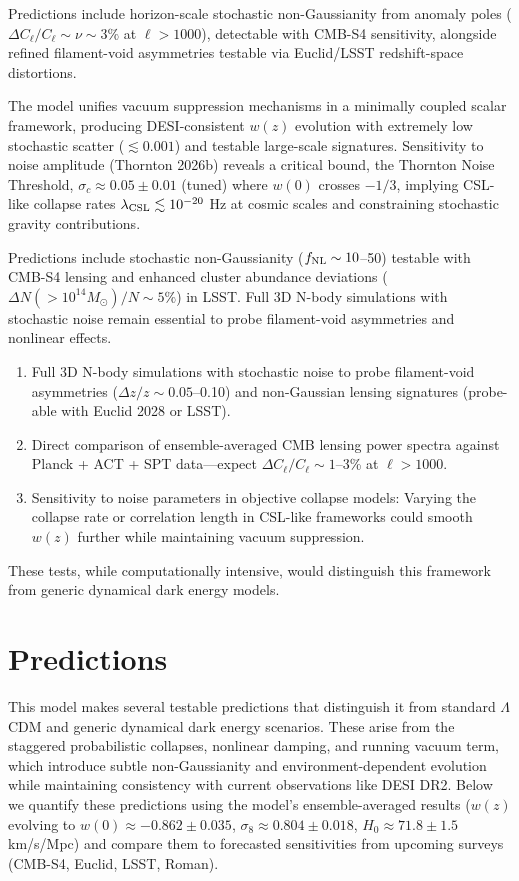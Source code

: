 \documentclass[preprint]{aastex7}
\begin{document}
Predictions include horizon-scale stochastic non-Gaussianity from anomaly poles (\( \Delta C_\ell / C_\ell \sim \nu \sim 3\% \) at \( \ell > 1000 \)), detectable with CMB-S4 sensitivity, alongside refined filament-void asymmetries testable via Euclid/LSST redshift-space distortions.

The model unifies vacuum suppression mechanisms in a minimally coupled scalar framework, producing DESI-consistent \( w(z) \) evolution with extremely low stochastic scatter (\( \lesssim 0.001 \)) and testable large-scale signatures. Sensitivity to noise amplitude (Thornton 2026b) reveals a critical bound, the Thornton Noise Threshold, \( \sigma_c \approx 0.05 \pm 0.01 \) (tuned) where \( w(0) \) crosses \( -1/3 \), implying CSL-like collapse rates \( \lambda_{\rm CSL} \lesssim 10^{-20} \) Hz at cosmic scales and constraining stochastic gravity contributions.

Predictions include stochastic non-Gaussianity (\( f_{\rm NL} \sim 10 \)--50) testable with CMB-S4 lensing and enhanced cluster abundance deviations (\( \Delta N(>10^{14} M_\odot)/N \sim 5\% \)) in LSST. Full 3D N-body simulations with stochastic noise remain essential to probe filament-void asymmetries and nonlinear effects.


\begin{enumerate}
\item Full 3D N-body simulations with stochastic noise to probe filament-void asymmetries (\( \Delta z/z \sim 0.05 \)--0.10) and non-Gaussian lensing signatures (probe-able with Euclid 2028 or LSST).
\item Direct comparison of ensemble-averaged CMB lensing power spectra against Planck + ACT + SPT data—expect \( \Delta C_\ell / C_\ell \sim 1 \)--3\% at \( \ell > 1000 \).
\item Sensitivity to noise parameters in objective collapse models: Varying the collapse rate or correlation length in CSL-like frameworks could smooth \( w(z) \) further while maintaining vacuum suppression.
\end{enumerate}

These tests, while computationally intensive, would distinguish this framework from generic dynamical dark energy models.

\section{Predictions} \label{sec:predictions}

This model makes several testable predictions that distinguish it from standard $\Lambda$CDM and generic dynamical dark energy scenarios. These arise from the staggered probabilistic collapses, nonlinear damping, and running vacuum term, which introduce subtle non-Gaussianity and environment-dependent evolution while maintaining consistency with current observations like DESI DR2. Below we quantify these predictions using the model's ensemble-averaged results (\( w(z) \) evolving to \( w(0) \approx -0.862 \pm 0.035 \), \( \sigma_8 \approx 0.804 \pm 0.018 \), \( H_0 \approx 71.8 \pm 1.5 \) km/s/Mpc) and compare them to forecasted sensitivities from upcoming surveys (CMB-S4, Euclid, LSST, Roman).
\end{document}

